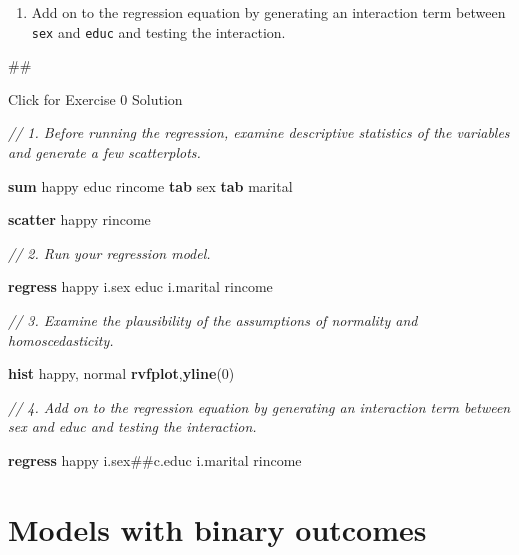 \documentclass[
]{book}
\newenvironment{Shaded}{\begin{snugshade}}{\end{snugshade}}
\newcommand{\CommentTok}[1]{\textcolor[rgb]{0.56,0.35,0.01}{\textit{#1}}}
\newcommand{\FunctionTok}[1]{\textcolor[rgb]{0.00,0.00,0.00}{#1}}
\newcommand{\KeywordTok}[1]{\textcolor[rgb]{0.13,0.29,0.53}{\textbf{#1}}}
\newcommand{\NormalTok}[1]{#1}
\providecommand{\tightlist}{%
  \setlength{\itemsep}{0pt}\setlength{\parskip}{0pt}}
\begin{document}
\begin{enumerate}
\def\labelenumi{\arabic{enumi}.}
\setcounter{enumi}{3}
\tightlist
\item
  Add on to the regression equation by generating an interaction term between \texttt{sex} and \texttt{educ} and testing the interaction.
\end{enumerate}

\begin{Shaded}
\begin{Highlighting}[]
\NormalTok{\#\#}
\end{Highlighting}
\end{Shaded}

{Click for Exercise 0 Solution}

\begin{alert}

\begin{Shaded}
\begin{Highlighting}[]
\CommentTok{// 1.  Before running the regression, examine descriptive statistics of the variables and generate a few scatterplots.}

\KeywordTok{sum}\NormalTok{ happy educ rincome }
\KeywordTok{tab}\NormalTok{ sex }
\KeywordTok{tab}\NormalTok{ marital }

\KeywordTok{scatter}\NormalTok{ happy rincome}

\CommentTok{// 2.  Run your regression model. }

\KeywordTok{regress}\NormalTok{ happy i.sex educ i.marital rincome}

\CommentTok{// 3.  Examine the plausibility of the assumptions of normality and homoscedasticity. }

\KeywordTok{hist}\NormalTok{ happy, }\FunctionTok{normal} 
\KeywordTok{rvfplot}\NormalTok{,}\KeywordTok{yline}\NormalTok{(0)}

\CommentTok{// 4.  Add on to the regression equation by generating an interaction term between \textasciigrave{}sex\textasciigrave{} and \textasciigrave{}educ\textasciigrave{} and testing the interaction.}

\KeywordTok{regress}\NormalTok{ happy i.sex\#\#c.educ i.marital rincome}
\end{Highlighting}
\end{Shaded}

\end{alert}

\hypertarget{models-with-binary-outcomes-1}{%
\section{Models with binary outcomes}\label{models-with-binary-outcomes-1}}
\end{document}

